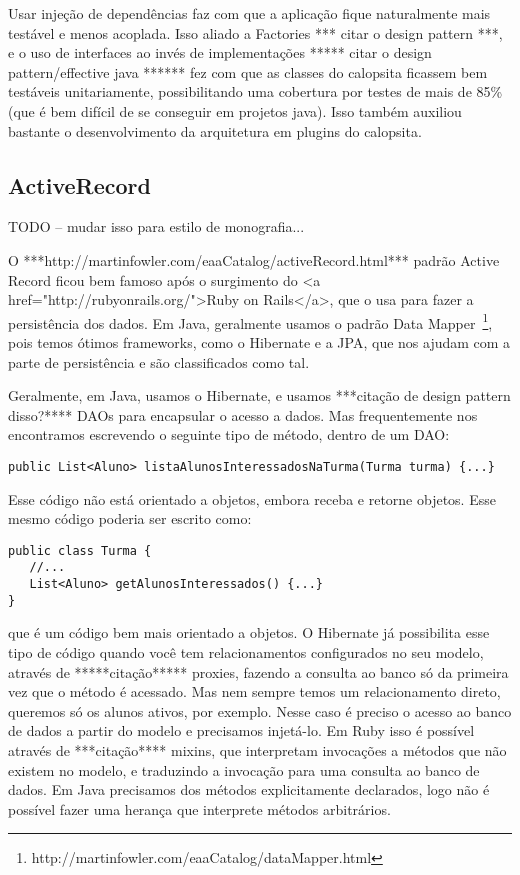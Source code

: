 Usar injeção de dependências faz com que a aplicação fique naturalmente mais testável e menos acoplada. Isso aliado a
Factories *** citar o design pattern ***, e o uso de interfaces ao invés de implementações ***** citar o design 
pattern/effective java ****** fez com que as classes do calopsita ficassem bem testáveis unitariamente, possibilitando 
uma cobertura por testes de mais de 85\% (que é bem difícil de se conseguir em projetos java). Isso também auxiliou bastante
o desenvolvimento da arquitetura em plugins do calopsita.

\subsection{ActiveRecord}

TODO -- mudar isso para estilo de monografia...

O ***http://martinfowler.com/eaaCatalog/activeRecord.html*** padrão Active Record ficou bem famoso após o 
surgimento do <a href="http://rubyonrails.org/">Ruby on Rails</a>, que o usa para fazer a persistência dos 
dados. Em Java, geralmente usamos o padrão Data Mapper~\footnote{http://martinfowler.com/eaaCatalog/dataMapper.html}, pois temos ótimos frameworks, como o Hibernate e a JPA, que nos ajudam com a parte de persistência e são classificados como tal.

Geralmente, em Java, usamos o Hibernate, e usamos ***citação de design pattern disso?**** DAOs para encapsular 
o acesso a dados. Mas frequentemente nos encontramos escrevendo o seguinte tipo de método, dentro de um DAO:

\begin{lstlisting}
public List<Aluno> listaAlunosInteressadosNaTurma(Turma turma) {...}
\end{lstlisting}

Esse código não está orientado a objetos, embora receba e retorne objetos. Esse mesmo código poderia ser escrito como:

\begin{lstlisting}
public class Turma {
   //...
   List<Aluno> getAlunosInteressados() {...}
}
\end{lstlisting}

que é um código bem mais orientado a objetos. O Hibernate já possibilita esse tipo de código quando você
tem relacionamentos configurados no seu modelo, através de *****citação***** proxies, fazendo a consulta ao banco
só da primeira vez que o método é acessado. Mas nem sempre temos um relacionamento direto, queremos só os alunos
ativos, por exemplo. Nesse caso é preciso o acesso ao banco de dados a partir do modelo e precisamos injetá-lo.
Em Ruby isso é possível através de ***citação**** mixins, que interpretam invocações a métodos que não existem no
modelo, e traduzindo a invocação para uma consulta ao banco de dados. Em Java precisamos dos métodos explicitamente
declarados, logo não é possível fazer uma herança que interprete métodos arbitrários.

